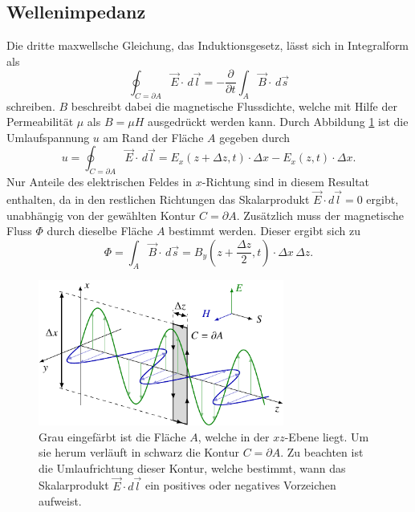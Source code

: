 \subsection{Wellenimpedanz}
\label{opt:subsection:wave_impedance}
%
Die dritte maxwellsche Gleichung, das Induktionsgesetz, lässt sich in Integralform als
%
\begin{equation}
\oint_{C=\partial A} \vec{E} \cdot\, d\vec{l}
=
-\frac{\partial}{\partial t} \int_{A} \vec{B} \cdot\, d\vec{s}
\label{opt:equation:maxwell_3}
\end{equation}
schreiben.
$B$ beschreibt dabei die magnetische Flussdichte, welche mit Hilfe der Permeabilität $\mu$ als $B = \mu H$ ausgedrückt werden kann.
Durch Abbildung \ref{opt:fig:electromagnetic_wave_2} ist die Umlaufspannung $u$ am Rand der Fläche $A$ gegeben durch
\begin{equation}
u
=
\oint_{C=\partial A} \vec{E} \cdot\, d\vec{l}
=
E_x(z+\Delta z,t) \cdot \Delta x - E_x(z,t) \cdot \Delta x
.
\label{opt:equation:induced_voltage}
\end{equation}
Nur Anteile des elektrischen Feldes in $x$-Richtung sind in diesem Resultat enthalten, da in den restlichen Richtungen das Skalarprodukt $\vec{E} \cdot d\vec{l} = 0$ ergibt, unabhängig von der gewählten Kontur $C = \partial A$.
Zusätzlich muss der magnetische Fluss $\Phi$ durch dieselbe Fläche $A$ bestimmt werden.
Dieser ergibt sich zu
\begin{equation}
\Phi
=
\int_{A} \vec{B} \cdot\, d\vec{s}
=
B_y\left(z+\frac{\Delta z}{2},t\right) \cdot \Delta x \,\Delta z
.
\label{opt:equation:magnetic_flux}
\end{equation}

\begin{figure}
    \centering
    \includegraphics[width=80.63mm]{papers/opt/images/electromagnetic_wave_2.pdf}
    \caption{Grau eingefärbt ist die Fläche $A$, welche in der $xz$-Ebene liegt.
    Um sie herum verläuft in schwarz die Kontur $C = \partial A$.
    Zu beachten ist die Umlaufrichtung dieser Kontur, welche bestimmt, wann das Skalarprodukt $\vec{E} \cdot d\vec{l}$ ein positives oder negatives Vorzeichen aufweist.}
    \label{opt:fig:electromagnetic_wave_2}
\end{figure}

